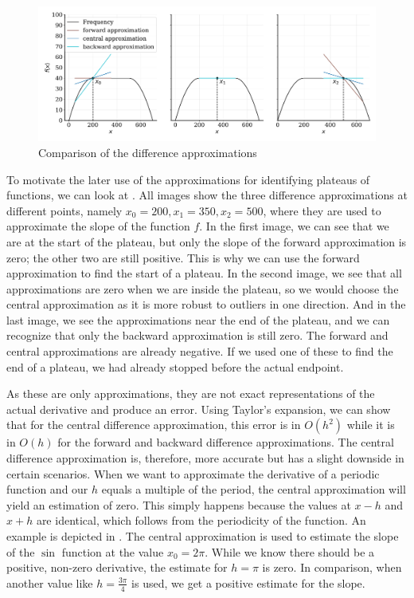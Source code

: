 \begin{figure}[H]
    \centering
    \includegraphics[width=\textwidth]{figures/approximations.pdf}
    \caption{Comparison of the difference approximations}
    \label{fig:approximations}
\end{figure}

To motivate the later use of the approximations for identifying plateaus of functions, we can look at . All images show the three difference approximations at different points, namely $x_0 = 200, x_1 = 350, x_2 = 500$, where they are used to approximate the slope of the function $f$. In the first image, we can see that we are at the start of the plateau, but only the slope of the forward approximation is zero; the other two are still positive. This is why we can use the forward approximation to find the start of a plateau. In the second image, we see that all approximations are zero when we are inside the plateau, so we would choose the central approximation as it is more robust to outliers in one direction. And in the last image, we see the approximations near the end of the plateau, and we can recognize that only the backward approximation is still zero. The forward and central approximations are already negative. If we used one of these to find the end of a plateau, we had already stopped before the actual endpoint.

As these are only approximations, they are not exact representations of the actual derivative and produce an error. Using Taylor's expansion, we can show that for the central difference approximation, this error is in $O(h^2)$ while it is in $O(h)$ for the forward and backward difference approximations. The central difference approximation is, therefore, more accurate but has a slight downside in certain scenarios. When we want to approximate the derivative of a periodic function and our $h$ equals a multiple of the period, the central approximation will yield an estimation of zero. This simply happens because the values at $x-h$ and $x + h$ are identical, which follows from the periodicity of the function. An example is depicted in . The central approximation is used to estimate the slope of the $\sin$ function at the value $x_0 = 2\pi$. While we know there should be a positive, non-zero derivative, the estimate for $h = \pi$ is zero. In comparison, when another value like $h = \frac{3\pi}{4}$ is used, we get a positive estimate for the slope.

